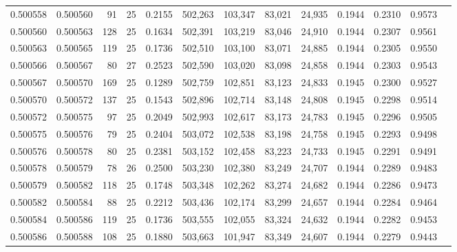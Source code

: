 \begin{tabular}{rrrrrrrrrrrrr}
0.500558 & 0.500560 &  91 &  25 &                                     0.2155 & 502,263 & 103,347 &  83,021 &  24,935 & 0.1944 & 0.2310 & 0.9573 \\
0.500560 & 0.500563 & 128 &  25 &                                     0.1634 & 502,391 & 103,219 &  83,046 &  24,910 & 0.1944 & 0.2307 & 0.9561 \\
0.500563 & 0.500565 & 119 &  25 &                                     0.1736 & 502,510 & 103,100 &  83,071 &  24,885 & 0.1944 & 0.2305 & 0.9550 \\
0.500566 & 0.500567 &  80 &  27 &                                     0.2523 & 502,590 & 103,020 &  83,098 &  24,858 & 0.1944 & 0.2303 & 0.9543 \\
0.500567 & 0.500570 & 169 &  25 &                                     0.1289 & 502,759 & 102,851 &  83,123 &  24,833 & 0.1945 & 0.2300 & 0.9527 \\
0.500570 & 0.500572 & 137 &  25 &                                     0.1543 & 502,896 & 102,714 &  83,148 &  24,808 & 0.1945 & 0.2298 & 0.9514 \\
0.500572 & 0.500575 &  97 &  25 &                                     0.2049 & 502,993 & 102,617 &  83,173 &  24,783 & 0.1945 & 0.2296 & 0.9505 \\
0.500575 & 0.500576 &  79 &  25 &                                     0.2404 & 503,072 & 102,538 &  83,198 &  24,758 & 0.1945 & 0.2293 & 0.9498 \\
0.500576 & 0.500578 &  80 &  25 &                                     0.2381 & 503,152 & 102,458 &  83,223 &  24,733 & 0.1945 & 0.2291 & 0.9491 \\
0.500578 & 0.500579 &  78 &  26 &                                     0.2500 & 503,230 & 102,380 &  83,249 &  24,707 & 0.1944 & 0.2289 & 0.9483 \\
0.500579 & 0.500582 & 118 &  25 &                                     0.1748 & 503,348 & 102,262 &  83,274 &  24,682 & 0.1944 & 0.2286 & 0.9473 \\
0.500582 & 0.500584 &  88 &  25 &                                     0.2212 & 503,436 & 102,174 &  83,299 &  24,657 & 0.1944 & 0.2284 & 0.9464 \\
0.500584 & 0.500586 & 119 &  25 &                                     0.1736 & 503,555 & 102,055 &  83,324 &  24,632 & 0.1944 & 0.2282 & 0.9453 \\
0.500586 & 0.500588 & 108 &  25 &                                     0.1880 & 503,663 & 101,947 &  83,349 &  24,607 & 0.1944 & 0.2279 & 0.9443 \\

\end{tabular}
